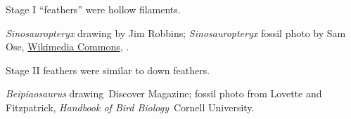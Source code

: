 \documentclass[t]{beamer}
\begin{document}
{
\begin{frame}[t,plain]{Stage I “feathers” were hollow filaments.}

\vfilll

\tiny \hfill \textit{Sinosauropteryx} drawing by Jim Robbins; \textit{Sinosauropteryx} fossil photo by Sam Ose, \href{https://commons.wikimedia.org/w/index.php?curid=4209411}{Wikimedia Commons}, .

\end{frame}
}
%
{
\begin{frame}[t,plain]{Stage II feathers were similar to down feathers.}

\vfilll

\tiny \hfill \textit{Beipiaosaurus} drawing \textcopyright\,Discover Magazine; fossil photo from Lovette and Fitzpatrick, \textit{Handbook of Bird Biology} \textcopyright\,Cornell University.

\end{frame}
}
%
\end{document}
